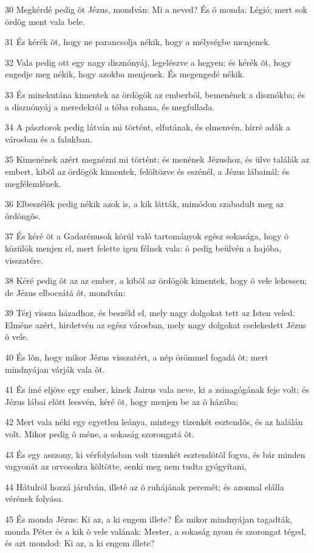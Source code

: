 \par 30 Megkérdé pedig õt Jézus, mondván: Mi a neved? És õ monda: Légió; mert sok ördög ment vala bele.
\par 31 És kérék õt, hogy ne parancsolja nékik, hogy a mélységbe menjenek.
\par 32 Vala pedig ott egy nagy disznónyáj, legelészve a hegyen; és kérék õt, hogy engedje meg nékik, hogy azokba menjenek. És megengedé nékik.
\par 33 És minekutána kimentek az ördögök az emberbõl, bemenének a disznókba; és a disznónyáj a meredekrõl a tóba rohana, és megfullada.
\par 34 A pásztorok pedig látván mi történt, elfutának, és elmenvén, hírré adák a városban és a falukban.
\par 35 Kimenének azért megnézni mi történt; és menének Jézushoz, és ülve találák az embert, kibõl az ördögök kimentek, felöltözve és eszénél, a Jézus lábainál; és megfélemlének.
\par 36 Elbeszélék pedig nékik azok is, a kik látták, mimódon szabadult meg az ördöngõs.
\par 37 És kéré õt a Gadarénusok körül való tartományok egész sokasága, hogy õ közülök menjen el, mert felette igen félnek vala: õ pedig beülvén a hajóba, visszatére.
\par 38 Kéré pedig õt az az ember, a kibõl az ördögök kimentek, hogy õ vele lehessen; de Jézus elbocsátá õt, mondván:
\par 39 Térj vissza házadhoz, és beszéld el, mely nagy dolgokat tett az Isten veled. Elméne azért, hirdetvén az egész városban, mely nagy dolgokat cselekedett Jézus õ vele.
\par 40 És lõn, hogy mikor Jézus visszatért, a nép örömmel fogadá õt; mert mindnyájan várják vala õt.
\par 41 És ímé eljöve egy ember, kinek Jairus vala neve, ki a zsinagógának feje volt; és Jézus lábai elõtt leesvén, kéré õt, hogy menjen be az õ házába;
\par 42 Mert vala néki egy egyetlen leánya, mintegy tizenkét esztendõs, és az halálán volt. Mikor pedig õ méne, a sokaság szorongatá õt.
\par 43 És egy asszony, ki vérfolyásban volt tizenkét esztendõtõl fogva, és bár minden vagyonát az orvosokra költötte, senki meg nem tudta gyógyítani,
\par 44 Hátulról hozzá járulván, illeté az õ ruhájának peremét; és azonnal elálla vérének folyása.
\par 45 És monda Jézus: Ki az, a ki engem illete? És mikor mindnyájan tagadták, monda Péter és a kik õ vele valának: Mester, a sokaság nyom és szorongat téged, és azt mondod: Ki az, a ki engem illete?
